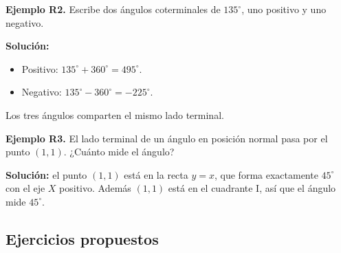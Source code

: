 \documentclass[12pt, letterpaper]{article}
\begin{document}
\textbf{Ejemplo R2.} Escribe dos ángulos coterminales de $135^{\circ}$, uno positivo y uno negativo.

\begin{cuadrosolucion}
  \textbf{Solución:}
  \begin{itemize}
    \item Positivo: $135^{\circ} + 360^{\circ} = 495^{\circ}$.
    \item Negativo: $135^{\circ} - 360^{\circ} = -225^{\circ}$.
  \end{itemize}
  Los tres ángulos comparten el mismo lado terminal.
\end{cuadrosolucion}

\textbf{Ejemplo R3.} El lado terminal de un ángulo en posición normal pasa por el punto $(1, 1)$. ¿Cuánto mide el ángulo?

\begin{cuadrosolucion}
  \textbf{Solución:} el punto $(1, 1)$ está en la recta $y = x$, que forma exactamente $45^{\circ}$ con el eje $X$ positivo. Además $(1, 1)$ está en el cuadrante I, así que el ángulo mide $45^{\circ}$.
  \begin{center}
  \end{center}
\end{cuadrosolucion}

\newpage %

\subsection{Ejercicios propuestos}
\end{document}
